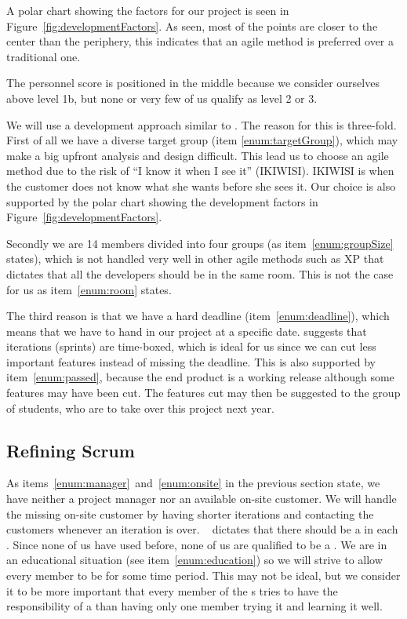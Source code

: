 
A polar chart showing the factors for our project is seen in Figure~\ref{fig:developmentFactors}.
As seen, most of the points are closer to the center than the periphery, this indicates that an agile method is preferred over a traditional one.

The personnel score is positioned in the middle because we consider ourselves above level 1b, but none or very few of us qualify as level 2 or 3.


We will use a development approach similar to \sos{}.
The reason for this is three-fold.
First of all we have a diverse target group (item \ref{enum:targetGroup}), which may make a big upfront analysis and design difficult.
This lead us to choose an agile method due to the risk of ``I know it when I see it'' (IKIWISI).
IKIWISI is when the customer does not know what she wants before she sees it.
Our choice is also supported by the polar chart showing the development factors in Figure~\ref{fig:developmentFactors}.

Secondly we are 14 members divided into four groups (as item~\ref{enum:groupSize} states), which is not handled very well in other agile methods such as XP that dictates that all the developers should be in the same room.
This is not the case for us as item~\ref{enum:room} states.

The third reason is that we have a hard deadline (item~\ref{enum:deadline}), which means that we have to hand in our project at a specific date.
\Sos{} suggests that iterations (sprints) are time-boxed, which is ideal for us since we can cut less important features instead of missing the deadline.
This is also supported by item~\ref{enum:passed}, because the end product is a working release although some features may have been cut.
The features cut may then be suggested to the group of students, who are to take over this project next year.


\subsection{Refining Scrum} 
\label{sub:rescrum}
As items~\ref{enum:manager}~and~\ref{enum:onsite} in the previous section state, we have neither a project manager nor an available on-site customer.
We will handle the missing on-site customer by having shorter iterations and contacting the customers whenever an iteration is over.
\Sos{}~\cite{scrumOfScrums} dictates that there should be a \scrummaster{} in each \subgroup{}.
Since none of us have used \scrum{} before, none of us are qualified to be a \scrummaster{}.
We are in an educational situation (see item~\ref{enum:education}) so we will strive to allow every member to be \scrummaster{} for some time period.
This may not be ideal, but we consider it to be more important that every member of the \subgroup{}s tries to have the responsibility of a \scrummaster{} than having only one member trying it and learning it well.

